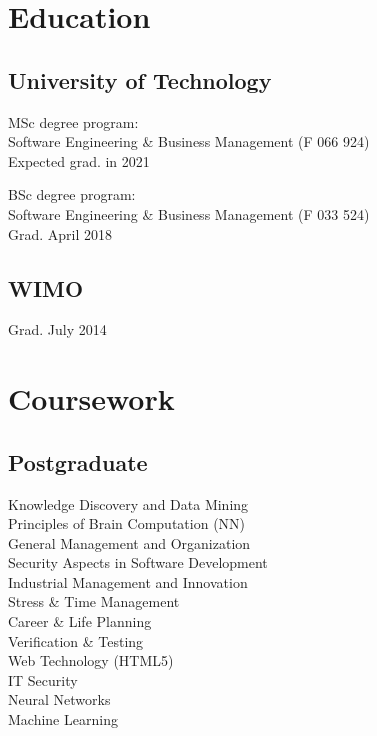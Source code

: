 \documentclass[]{resume}
\begin{document}
\begin{minipage}[t]{0.33\textwidth} 
\section{Education} 

\subsection{University of Technology}
MSc degree program: \\
Software Engineering \& Business Management (F 066 924)\\
Expected grad. in 2021
\sectionsep

BSc degree program: \\
Software Engineering \& Business Management (F 033 524)\\
Grad. April 2018
\sectionsep

\subsection{WIMO}
Grad. July 2014
\sectionsep
\section{Coursework}
\subsection{Postgraduate}
Knowledge Discovery and Data Mining \\
Principles of Brain Computation (NN) \\
General Management and Organization \\
Security Aspects in Software Development \\
Industrial Management and Innovation \\
Stress \& Time Management \\
Career \& Life Planning \\
Verification \& Testing \\
Web Technology (HTML5) \\
IT Security \\
Neural Networks \\
Machine Learning
\sectionsep


\end{minipage}
\end{document}
